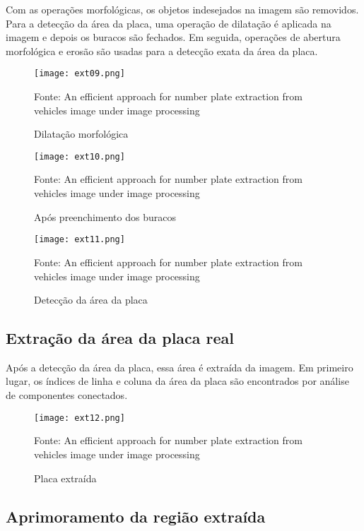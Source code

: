 Com as operações morfológicas, os objetos indesejados na imagem são removidos.
Para a detecção da área da placa, uma operação de dilatação é aplicada na imagem
e depois os buracos são fechados. Em seguida, operações de abertura morfológica
e erosão são usadas para a detecção exata da área da placa.

\begin{figure}[H]
	\centering
	\texttt{[image: ext09.png]}
	\caption{Dilatação morfológica}
Fonte: An efficient approach for number plate extraction from vehicles image under image processing~\cite{kaur2014efficient}
	\label{fig:ext_morphological_dilation}
\end{figure}

\begin{figure}[H]
	\centering
	\texttt{[image: ext10.png]}
	\caption{Após preenchimento dos buracos}
Fonte: An efficient approach for number plate extraction from vehicles image under image processing~\cite{kaur2014efficient}
	\label{fig:ext_holes_filled}
\end{figure}

\begin{figure}[H]
	\centering
	\texttt{[image: ext11.png]}
	\caption{Detecção da área da placa}
Fonte: An efficient approach for number plate extraction from vehicles image under image processing~\cite{kaur2014efficient}
	\label{fig:ext_plate_area_detection}
\end{figure}

\subsection{Extração da área da placa real}

Após a detecção da área da placa, essa área é extraída da imagem. Em primeiro
lugar, os índices de linha e coluna da área da placa são encontrados por análise
de componentes conectados.

\begin{figure}[H]
	\centering
	\texttt{[image: ext12.png]}
	\caption{Placa extraída}
Fonte: An efficient approach for number plate extraction from vehicles image under image processing~\cite{kaur2014efficient}
	\label{fig:ext_true_number_plate}
\end{figure}

\subsection{Aprimoramento da região extraída}

